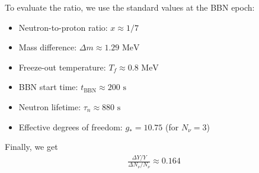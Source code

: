To evaluate the ratio, we use the standard values at the BBN epoch:
\begin{itemize}
    \item Neutron-to-proton ratio: $x \approx 1/7$
    \item Mass difference: $\Delta m \approx 1.29 \text{ MeV}$
    \item Freeze-out temperature: $T_f \approx 0.8 \text{ MeV}$
    \item BBN start time: $t_{\text{BBN}} \approx 200 \text{ s}$
    \item Neutron lifetime: $\tau_n \approx 880 \text{ s}$
    \item Effective degrees of freedom: $g_* = 10.75$ (for $N_\nu = 3$)
\end{itemize}
Finally, we get \begin{align}
\frac{\Delta Y/Y}{\Delta N_\nu / N_\nu}  \approx \mathbf{0.164}
\end{align}



